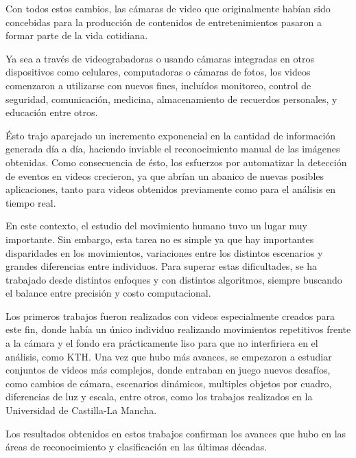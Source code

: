 Con todos estos cambios, las cámaras de video que originalmente habían sido concebidas para la producción de contenidos de entretenimientos pasaron a
formar parte de la vida cotidiana.

Ya sea a través de videograbadoras o usando cámaras integradas en otros dispositivos como celulares, computadoras o cámaras de fotos, los videos
comenzaron a utilizarse con nuevos fines, incluídos monitoreo, control de seguridad, comunicación, medicina, almacenamiento de recuerdos personales,
y educación entre otros.

Ésto trajo aparejado un incremento exponencial en la cantidad de información generada día a día, haciendo inviable el reconocimiento manual de las
imágenes obtenidas. Como consecuencia de ésto, los esfuerzos por automatizar la detección de eventos en videos crecieron, ya que abrían un abanico
de nuevas posibles aplicaciones, tanto para videos obtenidos previamente como para el análisis en tiempo real.

En este contexto, el estudio del movimiento humano tuvo un lugar muy importante. Sin embargo, esta tarea no es simple ya que hay importantes disparidades
en los movimientos, variaciones entre los distintos escenarios y grandes diferencias entre individuos. Para superar estas dificultades, se ha trabajado
desde distintos enfoques y con distintos algoritmos, siempre buscando el balance entre precisión y costo computacional.

Los primeros trabajos fueron realizados con videos especialmente creados para este fin, donde había un único individuo realizando movimientos repetitivos
frente a la cámara y el fondo era prácticamente liso para que no interfiriera en el análisis, como KTH\parencite{schuldt2004recognizing}. Una vez que hubo
más avances, se empezaron a estudiar conjuntos de videos más complejos, donde entraban en juego nuevos desafíos, como cambios de cámara, escenarios
dinámicos, multiples objetos por cuadro, diferencias de luz y escala, entre otros, como los trabajos realizados en la Universidad de Castilla-La
Mancha\parencite{nievas2011violence, deniz2014fast}.

Los resultados obtenidos en estos trabajos confirman los avances que hubo en las áreas de reconocimiento y clasificación en las últimas décadas.





\iffalse
Un método común y que ha resultado ser eficiente para obtener información a partir de imágenes es la utilización de descriptores.
Estos descriptores informan acerca de las características visuales de la imagen, describiendo características elementales como la forma, el color,
la textura y la ubicación de elementos dentro de la misma.
Para extender esta idea al plano de los videos, lo que se hace es desglosar el video en las imágenes que lo componen (frames), para luego analizar por separado
cada una de ellas. Con esta información ya disponible se incorpora el factor temporal, siendo éste el eje en la relación entre los distintos frames, permitiendo,
por ejemplo, analizar variaciones de un frame a otro.
\fi
